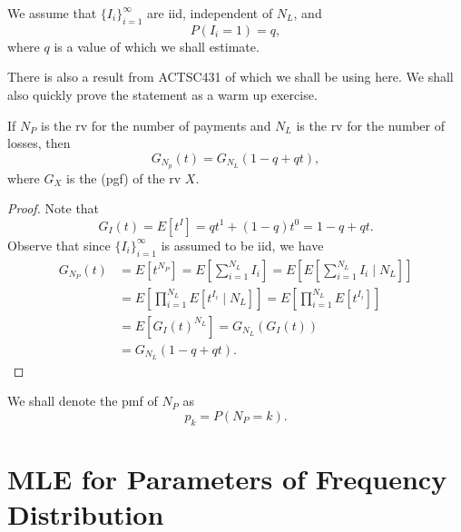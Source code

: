 \documentclass[notoc,notitlepage]{tufte-book}
\begin{document}
We assume that $\{ I_i \}_{i=1}^{\infty}$ are iid, independent of $N_L$,
and
\begin{equation*}
  P(I_i = 1) = q,
\end{equation*}
where $q$ is a value of which we shall estimate.

There is also a result from ACTSC431 of which we shall be using here.
We shall also quickly prove the statement as a warm up exercise.

\begin{propo}\label{propo:pgf_of_number_of_payments}
  If $N_P$ is the rv for the number of payments and $N_L$ is the rv
  for the number of losses, then
  \begin{equation*}
    G_{N_p}(t) = G_{N_L}(1 - q + qt),
  \end{equation*}
  where $G_X$ is the  (pgf)
  of the rv $X$.
\end{propo}

\begin{proof}
  Note that
  \begin{equation*}
    G_I(t) = E [ t^I ] = qt^1 + (1 - q)t^0 = 1 - q + qt.
  \end{equation*}
  Observe that since $\{ I_i \}_{i=1}^{\infty}$ is assumed to be iid,
  we have
  \begin{align*}
    G_{N_P}(t)
    &= E \left[ t^{N_P} \right]
     = E \left[ \sum_{i=1}^{N_L} I_i \right]
     = E \left[ E \left[ \sum_{i=1}^{N_L} I_i \mid N_L \right] \right] \\
    &= E \left[ \prod_{i=1}^{N_L} E \left[ t^{I_i} \mid N_L \right] \right]
     = E \left[ \prod_{i=1}^{N_L} E \left[ t^{I_i} \right] \right] \\
    &= E \left[ G_I(t)^{N_L} \right]
     = G_{N_L}(G_I(t)) \\
    &= G_{N_L}(1 - q + qt).
  \end{align*}
\end{proof}

\begin{notation}
  We shall denote the pmf of $N_P$ as
  \begin{equation*}
    p_k = P(N_P = k).
  \end{equation*}
\end{notation}


\section{MLE for Parameters of Frequency Distribution}%
\label{sec:mle_for_parameters_of_frequency_distribution}
\end{document}
